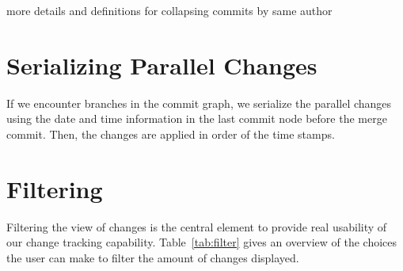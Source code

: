 more details and definitions for collapsing commits by same author



\section{Serializing Parallel Changes}


If we encounter branches in the commit graph, we serialize the parallel changes using the date and time information in the last commit node before the merge commit.  Then, the changes are applied in order of the time stamps.%




\section{Filtering}

Filtering the view of changes is the central element to provide real usability of our change tracking capability.  Table~\ref{tab:filter} gives an overview of the choices the user can make to filter the amount of changes displayed.

